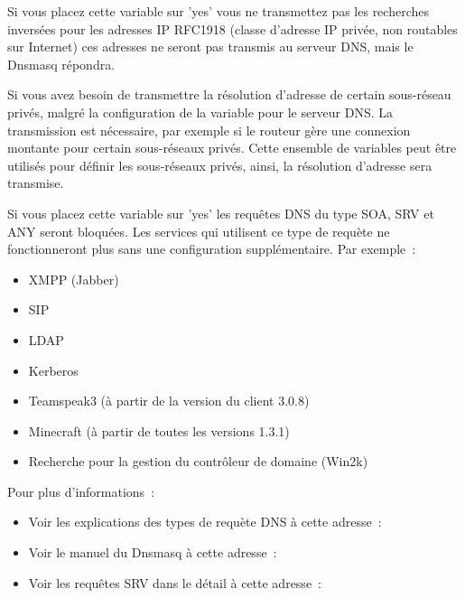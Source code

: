 \begin{description}

      {Si vous placez cette variable sur 'yes' vous ne transmettez pas les
      recherches inversées pour les adresses IP RFC1918 (classe d'adresse IP
      privée, non routables sur Internet) ces adresses ne seront pas transmis
      au serveur DNS, mais le Dnsmasq répondra.}


     Si vous avez besoin de transmettre la résolution d'adresse de certain sous-réseau
	 privés, malgré la configuration de la variable  pour le serveur DNS.
	 La transmission est nécessaire, par exemple si le routeur gère une connexion montante pour
	 certain sous-réseaux privés. Cette ensemble de variables peut être utilisés pour définir
	 les sous-réseaux privés, ainsi, la résolution d'adresse sera transmise.


     {Si vous placez cette variable sur 'yes' les requêtes DNS du type SOA, SRV
     et ANY seront bloquées. Les services qui utilisent ce type de requète ne
     fonctionneront plus sans une configuration supplémentaire.\hfil\break
     Par exemple~:
     \begin{itemize}
     \item XMPP (Jabber)
     \item SIP
     \item LDAP
     \item Kerberos
     \item Teamspeak3 (à partir de la version du client 3.0.8)
     \item Minecraft (à partir de toutes les versions 1.3.1)
     \item Recherche pour la gestion du contrôleur de domaine (Win2k)
     \end{itemize}
     Pour plus d'informations~:}
     \begin{itemize}
     \item Voir les explications des types de requète DNS à cette adresse~:\hfil\break
     \item Voir le manuel du Dnsmasq à cette adresse~:\hfil\break
     \item Voir les requêtes SRV dans le détail à cette adresse~:\hfil\break
     \end{itemize}


\end{description}
